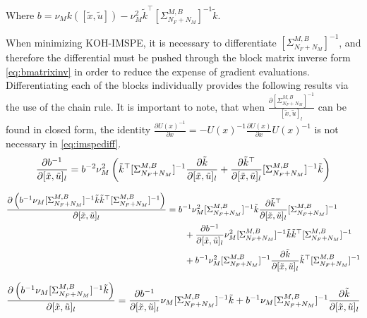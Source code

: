 \documentclass[
]{article}
\begin{document}
Where \(b = \nu_M k([\tilde{x}, \tilde{u}]) - \nu_M^2 \tilde{k}^{\top}[\Sigma^{M,B}_{N_F + N_M}]^{-1}\tilde{k}\).

When minimizing KOH-IMSPE, it is necessary to differentiate \([\Sigma^{M,B}_{N_F + N_M}]^{-1}\), and therefore the differential must be pushed through the block matrix inverse form \eqref{eq:bmatrixinv} in order to reduce the expense of gradient evaluations. Differentiating each of the blocks individually provides the following results via the use of the chain rule. It is important to note, that when \(\frac{\partial[\Sigma^{M,B}_{N_F + N_M}]^{-1}}{[\tilde{x}, \tilde{u}]_l}\) can be found in closed form, the identity \(\frac{\partial U(x)^{-1}}{\partial x} = -U(x)^{-1} \frac{\partial U(x)}{\partial x}U(x)^{-1}\) is not necessary in \eqref{eq:imspediff}.
\begin{equation}
\frac{\partial b^{-1}}{\partial [\tilde{x}, \tilde{u}]_l} = b^{-2}\nu_M^2\left(\tilde{k}^{\top}[\Sigma^{M,B}_{N_F + N_M}]^{-1}\frac{\partial \tilde{k}}{\partial [\tilde{x}, \tilde{u}]_l} + \frac{\partial \tilde{k}^{\top}}{\partial [\tilde{x}, \tilde{u}]_l}[\Sigma^{M,B}_{N_F + N_M}]^{-1} \tilde{k}\right) 
\notag
\end{equation}

\begin{equation}
\begin{split}
\frac{\partial \left(b^{-1}\nu_M[\Sigma^{M,B}_{N_F + N_M}]^{-1}\tilde{k}\tilde{k}^{\top}[\Sigma^{M,B}_{N_F + N_M}]^{-1}\right)}{\partial [\tilde{x}, \tilde{u}]_l} &= b^{-1}\nu_M^2[\Sigma^{M,B}_{N_F + N_M}]^{-1}\tilde{k}\frac{\partial \tilde{k}^{\top}}{\partial[\tilde{x}, \tilde{u}]_l}[\Sigma^{M,B}_{N_F + N_M}]^{-1} \\
& \qquad + \frac{\partial b^{-1}}{\partial [\tilde{x}, \tilde{u}]_l} \nu_M^2[\Sigma^{M,B}_{N_F + N_M}]^{-1}\tilde{k}\tilde{k}^{\top}[\Sigma^{M,B}_{N_F + N_M}]^{-1} \\
& \qquad + b^{-1}\nu_M^2[\Sigma^{M,B}_{N_F + N_M}]^{-1}\frac{\partial \tilde{k}}{\partial [\tilde{x}, \tilde{u}]_l}\tilde{k}^{\top}[\Sigma^{M,B}_{N_F + N_M}]^{-1}
\end{split}
\notag
\end{equation}

\begin{equation}
\frac{\partial \left(b^{-1}\nu_M[\Sigma^{M,B}_{N_F + N_M}]^{-1}\tilde{k}\right)}{\partial[\tilde{x}, \tilde{u}]_l} = \frac{\partial b^{-1}}{\partial [\tilde{x}, \tilde{u}]_l} \nu_M[\Sigma^{M,B}_{N_F + N_M}]^{-1}\tilde{k} + b^{-1}\nu_M[\Sigma^{M,B}_{N_F + N_M}]^{-1}\frac{\partial \tilde{k}}{\partial [\tilde{x}, \tilde{u}]_l}
\notag
\end{equation}
\end{document}
